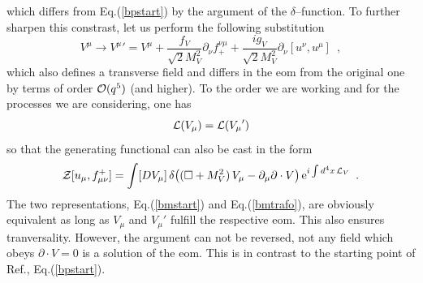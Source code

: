 which differs from Eq.(\ref{bpstart}) by the argument of the
$\delta$--function. To further sharpen this constrast, let us perform the
following substitution
\begin{equation}
V^\mu \to {V^\mu}' = V^\mu + \frac{f_V}{\sqrt{2}M_V^2} \partial_\nu f_+^{\nu
\mu} + \frac{i g_V}{\sqrt{2}M_V^2} \partial_\nu [u^\nu , u^\mu ] \, \, \, ,
\label{trafo}
\end{equation}
which also defines a transverse field and differs in the eom from the original
one by terms of order ${\cal O}(q^5)$ (and higher). To the order we are working
and for the processes we are considering, one has
\begin{equation}
{\cal L} (V_\mu ) = {\cal L} ( {V_\mu}' )
\end{equation}
so that the generating functional can also be cast in the form
\begin{equation}
{\cal Z}[u_\mu, f^+_{\mu \nu}]
= \int [DV_\mu] \, \delta\bigl( (\Box+M_V^2) \, V_\mu
- \partial_\mu \partial \cdot V \bigr)
\, {\rm e}^{i \int d^4x \, {\cal L}_V}
\, \, \, .
\label{bmtrafo}
\end{equation}
The two representations, Eq.(\ref{bmstart}) and Eq.(\ref{bmtrafo}), are
obviously equivalent as long as $V_\mu$
and $V_\mu '$ fulfill the  respective eom. This also ensures
 tranversality. However, the argument can not be reversed, not any
field which  obeys $\partial \cdot V =0$ is a solution of the eom. This is in
contrast to the starting point of Ref.\cite{bp}, Eq.(\ref{bpstart}).

